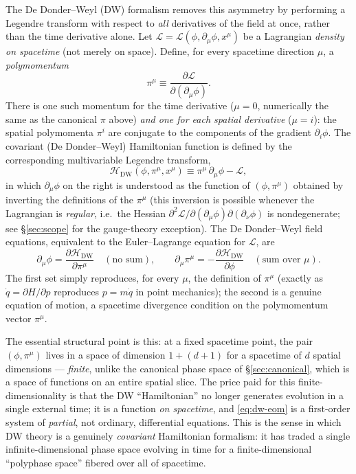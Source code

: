 \documentclass[11pt]{book}
\newcommand{\pdv}[2]{\dfrac{\partial #1}{\partial #2}}
\newcommand{\Lag}{\mathcal{L}}
\newcommand{\Ham}{\mathcal{H}}
\theoremstyle{definition}
\theoremstyle{remark}
\begin{document}
The De Donder--Weyl (DW) formalism removes this asymmetry by performing a Legendre transform with respect to \emph{all} derivatives of the field at once, rather than the time derivative alone. Let $\Lag=\Lag(\phi,\partial_\mu\phi,x^\mu)$ be a Lagrangian \emph{density on spacetime} (not merely on space). Define, for every spacetime direction $\mu$, a \emph{polymomentum}
\begin{equation}
\pi^\mu \equiv \pdv{\Lag}{(\partial_\mu\phi)}.
\end{equation}
There is one such momentum for the time derivative ($\mu=0$, numerically the same as the canonical $\pi$ above) \emph{and one for each spatial derivative} ($\mu=i$): the spatial polymomenta $\pi^i$ are conjugate to the components of the gradient $\partial_i\phi$. The covariant (De Donder--Weyl) Hamiltonian function is defined by the corresponding multivariable Legendre transform,
\begin{equation}
\Ham_{\mathrm{DW}}(\phi,\pi^\mu,x^\mu) \equiv \pi^\mu\,\partial_\mu\phi - \Lag ,
\label{eq:dw-hamiltonian}
\end{equation}
in which $\partial_\mu\phi$ on the right is understood as the function of $(\phi,\pi^\mu)$ obtained by inverting the definitions of the $\pi^\mu$ (this inversion is possible whenever the Lagrangian is \emph{regular}, i.e.\ the Hessian $\partial^2\Lag/\partial(\partial_\mu\phi)\partial(\partial_\nu\phi)$ is nondegenerate; see \S\ref{sec:scope} for the gauge-theory exception). The De Donder--Weyl field equations, equivalent to the Euler--Lagrange equation for $\Lag$, are
\begin{equation}
\partial_\mu\phi = \pdv{\Ham_{\mathrm{DW}}}{\pi^\mu} \quad(\text{no sum}), \qquad
\partial_\mu\pi^\mu = -\pdv{\Ham_{\mathrm{DW}}}{\phi} \quad(\text{sum over }\mu).
\label{eq:dw-eom}
\end{equation}
The first set simply reproduces, for every $\mu$, the definition of $\pi^\mu$ (exactly as $\dot q=\partial H/\partial p$ reproduces $p=m\dot q$ in point mechanics); the second is a genuine equation of motion, a spacetime divergence condition on the polymomentum vector $\pi^\mu$.

The essential structural point is this: at a fixed spacetime point, the pair $(\phi,\pi^\mu)$ lives in a space of dimension $1+(d+1)$ for a spacetime of $d$ spatial dimensions --- \emph{finite}, unlike the canonical phase space of \S\ref{sec:canonical}, which is a space of functions on an entire spatial slice. The price paid for this finite-dimensionality is that the DW ``Hamiltonian'' no longer generates evolution in a single external time; it is a function \emph{on spacetime}, and \eqref{eq:dw-eom} is a first-order system of \emph{partial}, not ordinary, differential equations. This is the sense in which DW theory is a genuinely \emph{covariant} Hamiltonian formalism: it has traded a single infinite-dimensional phase space evolving in time for a finite-dimensional ``polyphase space'' fibered over all of spacetime.
\end{document}

